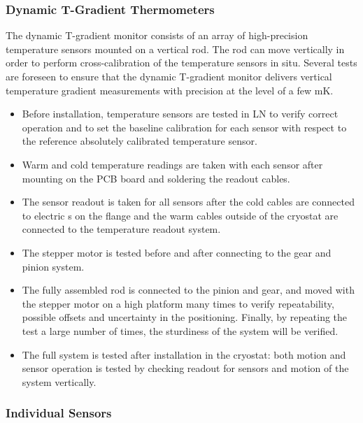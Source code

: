 \subsubsection{Dynamic T-Gradient Thermometers}
\label{sec:fdgen-slow-cryo-qc-thdy}

The dynamic T-gradient monitor consists of an array of high-precision temperature sensors mounted on a vertical rod. The rod can move vertically in order to perform cross-calibration of the temperature sensors in situ. Several tests are foreseen to ensure that the dynamic T-gradient monitor delivers vertical temperature gradient measurements with precision at the level of a few \si{mK}.

\begin{itemize}
\item
Before installation, temperature sensors are tested in LN to verify correct operation and to set the baseline calibration for each sensor with respect to the reference absolutely calibrated temperature sensor. 
\item
Warm and cold temperature readings are taken with each sensor after mounting on the PCB board and soldering %
the readout cables.
\item
The sensor readout is taken for all sensors after the cold cables are connected to electric \fdth{}s on the flange and the warm cables outside of the cryostat are connected to the temperature readout system.
\item 
The stepper motor is tested before and after connecting to the gear and pinion system.
\item
The fully assembled rod is connected to the pinion and gear, and moved with the stepper motor on a high platform many times to verify repeatability, possible offsets and uncertainty in the positioning. Finally, by repeating the test a large number of times, the sturdiness of the system will be verified.
\item
The full system is tested after installation in the cryostat: both motion and sensor operation is tested by checking readout for sensors and motion of the system vertically. 
\end{itemize} 

\subsubsection{Individual Sensors}
\label{sec:fdgen-slow-cryo-qc-is}

